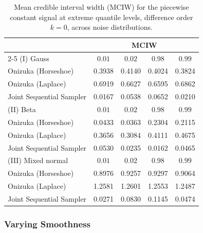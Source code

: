 \begin{table}[htbp]
\centering
\caption{Mean credible interval width (MCIW) for the piecewise constant signal at extreme quantile levels, difference order $k = 0$, across noise distributions.}
\label{tab:pc_ext_mciw}
\begin{tabular}{lcccc}
\toprule
& \multicolumn{4}{c}{MCIW} \\
\cmidrule(lr){2-5}
(I) Gauss & $0.01$ & $0.02$ & $0.98$ & $0.99$ \\
\midrule
Onizuka (Horseshoe)      & 0.3938 & 0.4140 & 0.4024 & 0.3824 \\
Onizuka (Laplace)        & 0.6919 & 0.6627 & 0.6595 & 0.6862 \\
Joint Sequential Sampler & 0.0167 & 0.0538 & 0.0652 & 0.0210 \\
\midrule
(II) Beta & $0.01$ & $0.02$ & $0.98$ & $0.99$ \\
\midrule
Onizuka (Horseshoe)      & 0.0433 & 0.0363 & 0.2304 & 0.2115 \\
Onizuka (Laplace)        & 0.3656 & 0.3084 & 0.4111 & 0.4675 \\
Joint Sequential Sampler & 0.0530 & 0.0235 & 0.0162 & 0.0465 \\
\midrule
(III) Mixed normal & $0.01$ & $0.02$ & $0.98$ & $0.99$ \\
\midrule
Onizuka (Horseshoe)      & 0.8976 & 0.9257 & 0.9297 & 0.9064 \\
Onizuka (Laplace)        & 1.2581 & 1.2601 & 1.2553 & 1.2487 \\
Joint Sequential Sampler & 0.0271 & 0.0830 & 0.1145 & 0.0474 \\
\bottomrule
\end{tabular}
\end{table}

\subsubsection{Varying Smoothness}
\label{sec:sim:joint:vs}

